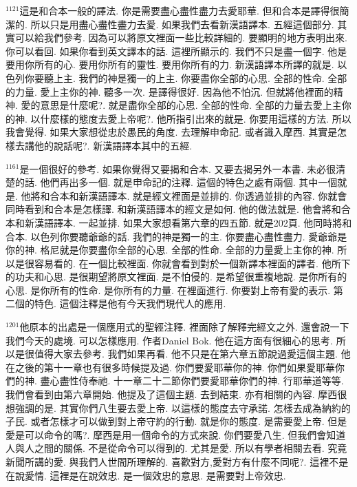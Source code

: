 \documentclass{book}
\begin{document}
$^{1121}$這是和合本一般的譯法.
你是需要盡心盡性盡力去愛耶華.
但和合本是譯得很簡潔的.
所以只是用盡心盡性盡力去愛.
如果我們去看新漢語譯本.
五經這個部分.
其實可以給我們參考.
因為可以將原文裡面一些比較詳細的.
要顯明的地方表明出來.
你可以看回.
如果你看到英文譯本的話.
這裡所顯示的.
我們不只是盡一個字.
他是要用你所有的心.
要用你所有的靈性.
要用你所有的力.
新漢語譯本所譯的就是.
以色列你要聽上主.
我們的神是獨一的上主.
你要盡你全部的心思.
全部的性命.
全部的力量.
愛上主你的神.
聽多一次.
是譯得很好.
因為他不怕沉.
但就將他裡面的精神.
愛的意思是什麼呢?.
就是盡你全部的心思.
全部的性命.
全部的力量去愛上主你的神.
以什麼樣的態度去愛上帝呢?.
他所指引出來的就是.
你要用這樣的方法.
所以我會覺得.
如果大家想從忠於愚民的角度.
去理解申命記.
或者識入摩西.
其實是怎樣去講他的說話呢?.
新漢語譯本其中的五經.

$^{1161}$是一個很好的參考.
如果你覺得又要揭和合本.
又要去揭另外一本書.
未必很清楚的話.
他們再出多一個.
就是申命記的注釋.
這個的特色之處有兩個.
其中一個就是.
他將和合本和新漢語譯本.
就是經文裡面是並排的.
你透過並排的內容.
你就會同時看到和合本是怎樣譯.
和新漢語譯本的經文是如何.
他的做法就是.
他會將和合本和新漢語譯本.
一起並排.
如果大家想看第六章的四五節.
就是202頁.
他同時將和合本.
以色列你要聽爺爺的話.
我們的神是獨一的主.
你要盡心盡性盡力.
愛爺爺是你的神.
格尼就是你要盡你全部的心思.
全部的性命.
全部的力量愛上主你的神.
所以是很容易看的.
在一個比較裡面.
你就會看到對於一個新譯本裡面的譯者.
他所下的功夫和心思.
是很期望將原文裡面.
是不怕侵的.
是希望很重複地說.
是你所有的心思.
是你所有的性命.
是你所有的力量.
在裡面進行.
你要對上帝有愛的表示.
第二個的特色.
這個注釋是他有今天我們現代人的應用.

$^{1201}$他原本的出處是一個應用式的聖經注釋.
裡面除了解釋完經文之外.
還會說一下我們今天的處境.
可以怎樣應用.
作者Daniel Bok.
他在這方面有很細心的思考.
所以是很值得大家去參考.
我們如果再看.
他不只是在第六章五節說過愛這個主題.
他在之後的第十一章也有很多時候提及過.
你們要愛耶華你的神.
你們如果愛耶華你們的神.
盡心盡性侍奉祂.
十一章二十二節你們要愛耶華你們的神.
行耶華道等等.
我們會看到由第六章開始.
他提及了這個主題.
去到結束.
亦有相關的內容.
摩西很想強調的是.
其實你們八生要去愛上帝.
以這樣的態度去守承諾.
怎樣去成為納約的子民.
或者怎樣才可以做到對上帝守約的行動.
就是你的態度.
是需要愛上帝.
但是愛是可以命令的嗎?.
摩西是用一個命令的方式來說.
你們要愛八生.
但我們會知道人與人之間的關係.
不是從命令可以得到的.
尤其是愛.
所以有學者相關去看.
究竟新聞所講的愛.
與我們人世間所理解的.
喜歡對方,愛對方有什麼不同呢?.
這裡不是在說愛情.
這裡是在說效忠.
是一個效忠的意思.
是需要對上帝效忠.
\end{document}
